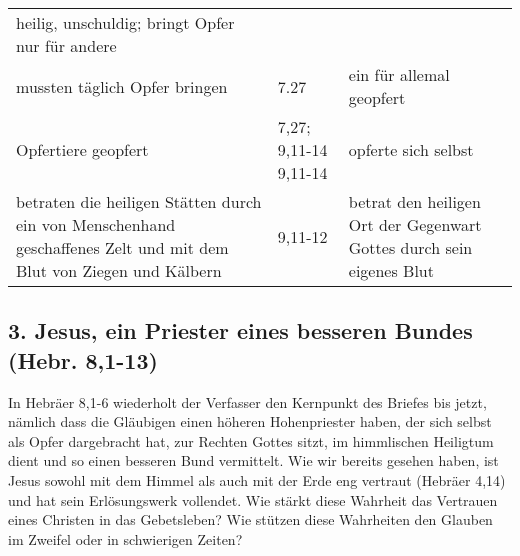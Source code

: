 \documentclass[
  12pt,
]{krantz}
\begin{document}
\begin{longtable}[]{@{}lll@{}}
\begin{minipage}[t]{0.35\columnwidth}
heilig, unschuldig; bringt
Opfer nur für andere\strut
\end{minipage}\tabularnewline
\begin{minipage}[t]{0.35\columnwidth}\raggedright
mussten täglich Opfer
bringen\strut
\end{minipage} & \begin{minipage}[t]{0.19\columnwidth}\raggedright
7.27\strut
\end{minipage} & \begin{minipage}[t]{0.35\columnwidth}\raggedright
ein für allemal geopfert\strut
\end{minipage}\tabularnewline
\begin{minipage}[t]{0.35\columnwidth}\raggedright
Opfertiere geopfert\strut
\end{minipage} & \begin{minipage}[t]{0.19\columnwidth}\raggedright
7,27; 9,11-14
9,11-14\strut
\end{minipage} & \begin{minipage}[t]{0.35\columnwidth}\raggedright
opferte sich selbst\strut
\end{minipage}\tabularnewline
\begin{minipage}[t]{0.35\columnwidth}\raggedright
betraten die heiligen
Stätten durch ein von
Menschenhand geschaffenes
Zelt und mit dem Blut von
Ziegen und Kälbern\strut
\end{minipage} & \begin{minipage}[t]{0.19\columnwidth}\raggedright
9,11-12\strut
\end{minipage} & \begin{minipage}[t]{0.35\columnwidth}\raggedright
betrat den heiligen Ort der
Gegenwart Gottes durch sein
eigenes Blut\strut
\end{minipage}\tabularnewline
\bottomrule
\end{longtable}

\hypertarget{jesus-ein-priester-eines-besseren-bundes-hebr.-81-13}{%
\subsection{3. Jesus, ein Priester eines besseren Bundes (Hebr. 8,1-13)}\label{jesus-ein-priester-eines-besseren-bundes-hebr.-81-13}}

In Hebräer 8,1-6 wiederholt der Verfasser den Kernpunkt des Briefes bis jetzt, nämlich dass die Gläubigen einen höheren Hohenpriester haben, der sich selbst als Opfer dargebracht hat, zur Rechten Gottes sitzt, im himmlischen Heiligtum dient und so einen besseren Bund vermittelt. Wie wir bereits gesehen haben, ist Jesus sowohl mit dem Himmel als auch mit der Erde eng vertraut (Hebräer 4,14) und hat sein Erlösungswerk vollendet. Wie stärkt diese Wahrheit das Vertrauen eines Christen in das Gebetsleben? Wie stützen diese Wahrheiten den Glauben im Zweifel oder in schwierigen Zeiten?
\end{document}
